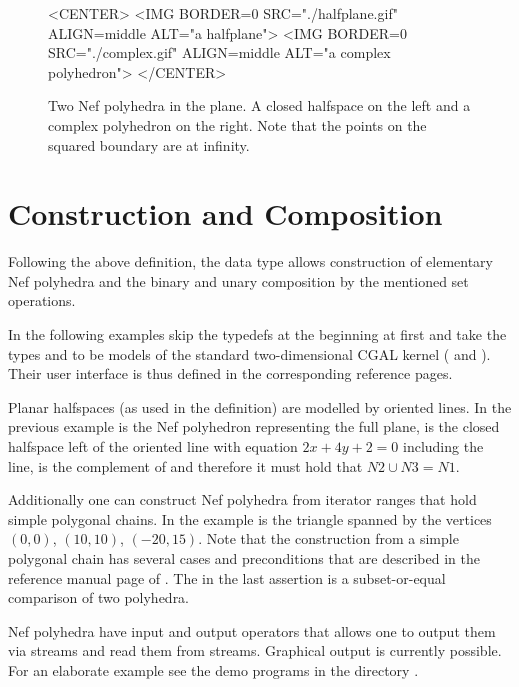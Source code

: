 \begin{figure}[htbp]
\begin{ccHtmlOnly}
<CENTER>
<IMG BORDER=0 SRC="./halfplane.gif" ALIGN=middle
ALT="a halfplane">
<IMG BORDER=0 SRC="./complex.gif" ALIGN=middle
ALT="a complex polyhedron">
</CENTER>
\end{ccHtmlOnly}
\caption{Two Nef polyhedra in the plane. A closed halfspace on the 
left and a complex polyhedron on the right. Note that the points 
on the squared boundary are at infinity.}\label{nefexamples}
\end{figure}      

\section{Construction and Composition}

Following the above definition, the data type
 allows construction of elementary Nef
polyhedra and the binary and unary composition by the mentioned set
operations.

In the following examples skip the typedefs at the beginning at first
and take the types  and  to be models of the
standard two-dimensional CGAL kernel (
and ). Their user interface is thus defined in
the corresponding reference pages.


Planar halfspaces (as used in the definition) are modelled by oriented
lines. In the previous example  is the Nef polyhedron
representing the full plane,  is the closed halfspace left of
the oriented line with equation $2x + 4y + 2 = 0$ including the line,
 is the complement of  and therefore it must hold that
$N2 \cup N3 = N1$.

Additionally one can construct Nef polyhedra from iterator ranges that
hold simple polygonal chains. In the example  is the triangle
spanned by the vertices $(0,0)$, $(10,10)$, $(-20,15)$.  Note that the
construction from a simple polygonal chain has several cases and
preconditions that are described in the reference manual page of
. The  in the last assertion
is a subset-or-equal comparison of two polyhedra.

Nef polyhedra have input and output operators that allows one to
output them via streams and read them from streams. Graphical output
is currently possible.  For an elaborate
example see the demo programs in the directory .

